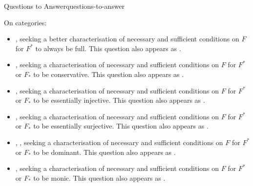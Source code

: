 \begin{remark}{Questions to Answer}{questions-to-answer}
\begin{itemize}
    \end{itemize}
    On categories:
    \begin{itemize}
        \item {}, seeking a better characterisation of necessary and sufficient conditions on $F$ for $F^{*}$ to always be full. This question also appears as \cite{MO468121}.
        \item {}, seeking a characterisation of necessary and sufficient conditions on $F$ for $F^{*}$ or $F_{*}$ to be conservative. This question also appears as \cite{MO468125}.
        \item {}, seeking a characterisation of necessary and sufficient conditions on $F$ for $F^{*}$ or $F_{*}$ to be essentially injective. This question also appears as \cite{MO468125}.
        \item {}, seeking a characterisation of necessary and sufficient conditions on $F$ for $F^{*}$ or $F_{*}$ to be essentially surjective. This question also appears as \cite{MO468125}.
        \item {}, , seeking a characterisation of necessary and sufficient conditions on $F$ for $F^{*}$ or $F_{*}$ to be dominant. This question also appears as \cite{MO468125}.
        \item {}, seeking a characterisation of necessary and sufficient conditions on $F$ for $F^{*}$ or $F_{*}$ to be monic. This question also appears as \cite{MO468125}.

\end{itemize}
\end{remark}

